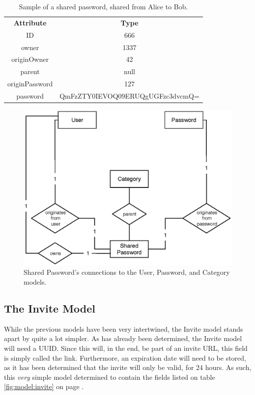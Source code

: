 			\begin{table}[p]
				\centering
				\begin{tabular}{c|c}
					\textbf{Attribute} 		& \textbf{Type} 											\\
					ID 						& 666 														\\
					owner 					& 1337 														\\
					originOwner 			& 42 														\\
					parent 					& null 														\\
					originPassword			& 127 														\\
					password				& QmFzZTY0IEVOQ09ERUQgUGFzc3dvcmQ= 							\\
				\end{tabular}
				\caption{Sample of a shared password, shared from Alice to Bob.}
				\label{fig:example:sharedpassword:sampleshare}
			\end{table}

			\begin{figure}[p]
				\centering
				\includegraphics[scale=0.75]{figures/design/uml/sharedpassword-ER-diag.eps}
				\caption{Shared Password's connections to the User, Password, and Category models.}
				\label{fig:relationship:sharedpassword}
			\end{figure}

		\subsection{The Invite Model}
			While the previous models have been very intertwined, the Invite model stands apart by quite a lot simpler. As has already been determined, the Invite model will need a UUID. Since this will, in the end, be part of an invite URL, this field is simply called the link. Furthermore, an expiration date will need to be stored, as it has been determined that the invite will only be valid, for 24 hours. As such, this \emph{very} simple model determined to contain the fields listed on table \ref{fig:model:invite} on page \pageref{fig:model:invite}. 
			
